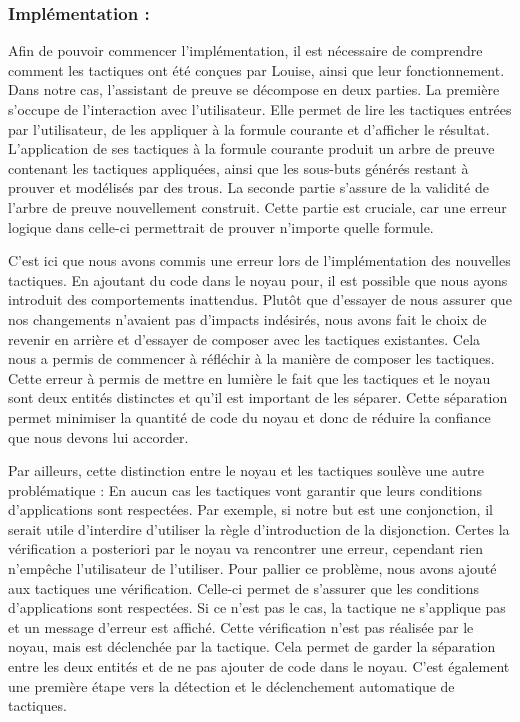 \documentclass[titlepage,draft]{article}
\begin{document}
\subsubsection{Implémentation :}
Afin de pouvoir commencer l'implémentation, il est nécessaire de comprendre comment les tactiques ont été conçues par Louise, ainsi que leur fonctionnement. Dans notre cas, l'assistant de preuve se décompose en deux parties. La première s'occupe de l'interaction avec l'utilisateur. Elle permet de lire les tactiques entrées par l'utilisateur, de les appliquer à la formule courante et d'afficher le résultat. L'application de ses tactiques à la formule courante produit un arbre de preuve contenant les tactiques appliquées, ainsi que les sous-buts générés restant à prouver et modélisés par des trous. La seconde partie s'assure de la validité de l'arbre de preuve nouvellement construit. Cette partie est cruciale, car une erreur logique dans celle-ci permettrait de prouver n'importe quelle formule.

C'est ici que nous avons commis une erreur lors de l'implémentation des nouvelles tactiques. En ajoutant du code dans le noyau pour, il est possible que nous ayons introduit des comportements inattendus. Plutôt que d'essayer de nous assurer que nos changements n'avaient pas d'impacts indésirés, nous avons fait le choix de revenir en arrière et d'essayer de composer avec les tactiques existantes. Cela nous a permis de commencer à réfléchir à la manière de composer les tactiques. Cette erreur à permis de mettre en lumière le fait que les tactiques et le noyau sont deux entités distinctes et qu'il est important de les séparer. Cette séparation permet minimiser la quantité de code du noyau et donc de réduire la confiance que nous devons lui accorder.

Par ailleurs, cette distinction entre le noyau et les tactiques soulève une autre problématique : En aucun cas les tactiques vont garantir que leurs conditions d'applications sont respectées. Par exemple, si notre but est une conjonction, il serait utile d'interdire d'utiliser la règle d'introduction de la disjonction. Certes la vérification a posteriori par le noyau va rencontrer une erreur, cependant rien n'empêche l'utilisateur de l'utiliser. Pour pallier ce problème, nous avons ajouté aux tactiques une vérification. Celle-ci permet de s'assurer que les conditions d'applications sont respectées. Si ce n'est pas le cas, la tactique ne s'applique pas et un message d'erreur est affiché. Cette vérification n'est pas réalisée par le noyau, mais est déclenchée par la tactique. Cela permet de garder la séparation entre les deux entités et de ne pas ajouter de code dans le noyau. C'est également une première étape vers la détection et le déclenchement automatique de tactiques.
\end{document}
